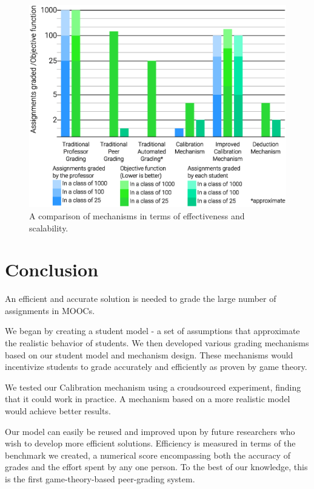 \documentclass{chi-ext}
\begin{document}
\begin{figure}
  \centering
  \includegraphics[width=\linewidth]{Comparison-Graph.eps}
  \caption{A comparison of mechanisms in terms of effectiveness and scalability.}
  \label{fig:comparison}
\end{figure}





\section{Conclusion}
An efficient and accurate solution is needed to grade the large number of assignments in MOOCs.

We began by creating a student model - a set of assumptions that approximate the realistic behavior of students. We then developed various grading mechanisms based on our student model and mechanism design. These mechanisms would incentivize students to grade accurately and efficiently as proven by game theory.

We tested our Calibration mechanism using a croudsourced experiment, finding that it could work in practice. A mechanism based on a more realistic model would achieve better results.

Our model can easily be reused and improved upon by future researchers who wish to develop more efficient solutions. Efficiency is measured in terms of the benchmark we created, a numerical score encompassing both the accuracy of grades and the effort spent by any one person. To the best of our knowledge, this is the first game-theory-based peer-grading system.
\end{document}
